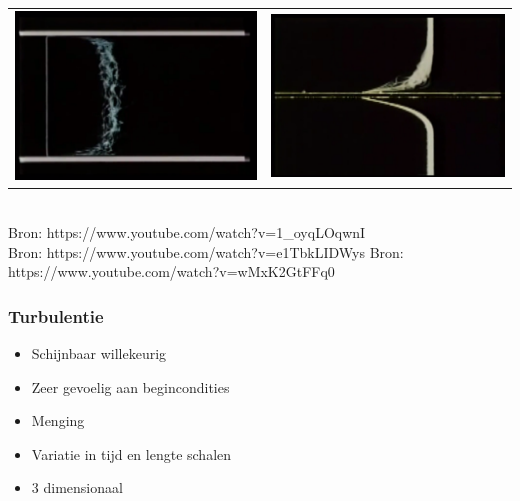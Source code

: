 \documentclass[t]{beamer}
\begin{document}
\begin{frame}
\begin{tabular}{cc}
{				\includegraphics[height=0.3\textheight]{fig/uitwendige_stroming/Turbulent_velocity_profile.png}
			}
			&
			\href{run:fig/uitwendige_stroming/Turbulent_laminar_velocity_profile.mp4}{
				\includegraphics[height=0.3\textheight]{fig/uitwendige_stroming/Turbulent_laminar_velocity_profile.png}
			}
		\end{tabular}\\
		
		\footnotesize{Bron: https://www.youtube.com/watch?v=1\_oyqLOqwnI}\\
		\footnotesize{Bron: https://www.youtube.com/watch?v=e1TbkLIDWys}
		\footnotesize{Bron: https://www.youtube.com/watch?v=wMxK2GtFFq0}
  	\end{frame}
  	\begin{frame}
		\frametitle{Turbulentie}
		\vspace{1cm}
		\begin{itemize}
			\pause
			\item Schijnbaar willekeurig
			\pause
			\item Zeer gevoelig aan begincondities
			\pause
			\item Menging
			\pause
			\item Variatie in tijd en lengte schalen
			\pause
			\item 3 dimensionaal
		\end{itemize}
  	\end{frame}
\end{document}
